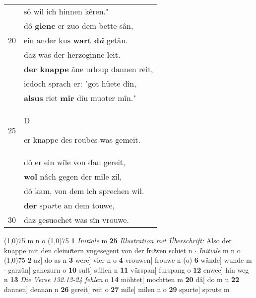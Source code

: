 \documentclass[8pt,a4paper,notitlepage]{article}
\begin{document}
\begin{table}[ht]
\begin{minipage}[t]{0.5\linewidth}
\begin{tabular}{rl}
 & sô wil ich hinnen kêren."\\ 
 & dô \textbf{gienc} er zuo dem bette sân,\\ 
20 & ein ander kus \textbf{wart d\textit{â}} getân.\\ 
 & daz was der herzoginne leit.\\ 
 & \textbf{der knappe} âne urloup dannen reit,\\ 
 & iedoch sprach er: "got hüete dîn,\\ 
 & \textbf{alsus} riet \textbf{mir} diu muoter mîn."\\ 
25 & \begin{large}D\end{large}er knappe des roubes was gemeit.\\ 
 & dô er ein wîle von dan gereit,\\ 
 & \textbf{wol} nâch gegen der mîle zil,\\ 
 & dô kam, von dem ich sprechen wil.\\ 
 & \textbf{der} sp\textit{ur}te an dem touwe,\\ 
30 & daz gesuochet was sîn vrouwe.\\ 
\end{tabular}
\scriptsize
\line(1,0){75} \newline
m n o \newline
\line(1,0){75} \newline
\textbf{1} \textit{Initiale} m  \textbf{25} \textit{Illustration mit Überschrift:} Also der knappe mit den cleinoͯtern vngesegent von der froͯwen schiet n   $\cdot$ \textit{Initiale} m n o  \newline
\line(1,0){75} \newline
\textbf{2} az] do as n \textbf{3} were] vier n o \textbf{4} vrouwen] frouwe n (o) \textbf{6} wânde] wunde m  $\cdot$ garzûn] ganczurn o \textbf{10} sult] súllen n \textbf{11} vürspan] furspang o \textbf{12} enwec] hin weg n \textbf{13} \textit{Die Verse 132.13-24 fehlen} o  \textbf{14} möhtet] mochtten m \textbf{20} dâ] do m n \textbf{22} dannen] dennan n \textbf{26} gereit] reit o \textbf{27} mîle] milen n o \textbf{29} spurte] sprute m \newline
\end{minipage}
\end{table}
\newpage
\end{document}
